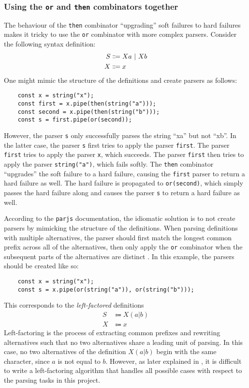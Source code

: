 \subsubsection{Using the \lstinline{or} and \lstinline{then} combinators together}
\label{parsing:thenor}
The behaviour of the \lstinline{then} combinator ``upgrading'' soft failures to hard failures makes it tricky to use the \lstinline{or} combinator with more complex parsers. Consider the following syntax definition:
\begin{align*}
    S &\Coloneqq Xa \ |\  Xb \\
    X &\Coloneqq x
\end{align*}
One might mimic the structure of the definitions and create parsers as follows:
\begin{lstlisting}
    const x = string("x");
    const first = x.pipe(then(string("a")));
    const second = x.pipe(then(string("b")));
    const s = first.pipe(or(second));
\end{lstlisting}
However, the parser \lstinline{s} only successfully parses the string ``xa'' but not ``xb''. In the latter case, the parser \lstinline{s} first tries to apply the parser \lstinline{first}. The parser \lstinline{first} tries to apply the parser \lstinline{x}, which succeeds. The parser \lstinline{first} then tries to apply the parser \lstinline{string("a")}, which fails softly. The \lstinline{then} combinator ``upgrades'' the soft failure to a hard failure, causing the \lstinline{first} parser to return a hard failure as well. The hard failure is propagated to \lstinline{or(second)}, which simply passes the hard failure along and causes the parser \lstinline{s} to return a hard failure as well.

According to the \lstinline{parjs} documentation, the idiomatic solution is to not create parsers by mimicking the structure of the definitions. When parsing definitions with multiple alternatives, the parser should first match the longest common prefix across all of the alternatives, then only apply the \lstinline{or} combinator when the subsequent parts of the alternatives are distinct \cite{parjs}. In this example, the parsers should be created like so:
\begin{lstlisting}
    const x = string("x");
    const s = x.pipe(or(string("a")), or(string("b")));
\end{lstlisting}
This corresponds to the \textit{left-factored} definitions
\begin{align*}
    S &\Coloneqq X(a|b) \\
    X &\Coloneqq x
\end{align*}
Left-factoring is the process of extracting common prefixes and rewriting alternatives such that no two alternatives share a leading unit of parsing. In this case, no two alternatives of the definition $X(a|b)$ begin with the same character, since $a$ is not equal to $b$. However, as later explained in , it is difficult to write a left-factoring algorithm that handles all possible cases with respect to the parsing tasks in this project.

